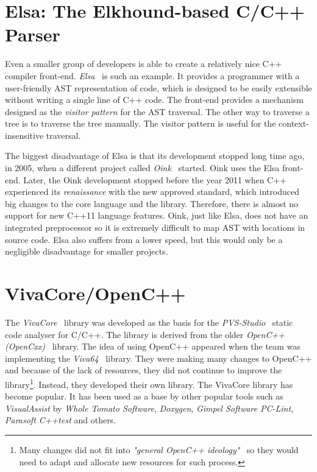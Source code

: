 \section{Elsa: The Elkhound-based C/C++ Parser}
Even a smaller group of developers is able to create a relatively nice C++ compiler front-end. \emph{Elsa}~\cite{elsa} is such an example. It provides a programmer with a user-friendly AST representation of code, which is designed to be easily extensible without writing a single line of C++ code. The front-end provides a mechanism designed as the \emph{visitor pattern} for the AST traversal. The other way to traverse a tree is to traverse the tree manually. The visitor pattern is useful for the context-insensitive traversal.

The biggest disadvantage of Elsa is that its development stopped long time ago, in 2005, when a different project called \emph{Oink}~\cite{oink} started. Oink uses the Elsa front-end. Later, the Oink development stopped before the year 2011 when C++ experienced its \textit{renaissance} with the new approved standard, which introduced big changes to the core language and the library. Therefore, there is almost no support for new C++11 language features. Oink, just like Elsa, does not have an integrated preprocessor so it is extremely difficult to map AST with locations in source code. Elsa also suffers from a lower speed, but this would only be a negligible disadvantage for smaller projects.

\section{VivaCore/OpenC++}
The \emph{VivaCore}~\cite{vivacore} library was developed as the basis for the \emph{PVS-Studio}~\cite{pvs-studio} static code analyser for C/C++. The library is derived from the older \emph{OpenC++ (OpenCxx)}~\cite{opencxx} library. The idea of using OpenC++ appeared when the team was implementing the \emph{Viva64}~\cite{vivacore} library. They were making many changes to OpenC++ and because of the lack of resources, they did not continue to improve the library\footnote{Many changes did not fit into \textit{"general OpenC++ ideology"}~\cite{vivacore-ideology} so they would need to adapt and allocate new resources for such process.}. Instead, they developed their own library. The VivaCore library has become popular. It has been used as a base by other popular tools such as \emph{VisualAssist} by \emph{Whole Tomato Software}, \emph{Doxygen}, \emph{Gimpel Software PC-Lint}, \emph{Parasoft C++test} and others.

